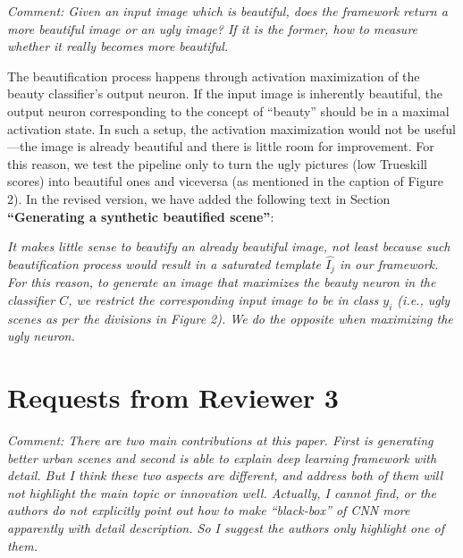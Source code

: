 \documentclass{paper}
\newenvironment{myquote}
{\definecolor{shadecolor}{rgb}{0.9,0.95,1} \begin{shaded*} \sf \em}
{\em\end{shaded*}}
\newenvironment{myquoteOrange}
{\definecolor{shadecolor}{rgb}{1,0.9,0.83} \begin{shaded*} \sf \em}
{\em\end{shaded*}}
\begin{document}
\begin{myquote}
\noindent Comment: Given an input image which is beautiful, does the framework return a more beautiful image or an ugly image? If it is the former, how to measure whether it really becomes more beautiful. 
\end{myquote}

\noindent The beautification process happens through activation maximization of the beauty classifier's output neuron. If the input image is inherently beautiful, the output neuron corresponding to the concept of ``beauty'' should be in a maximal activation state. In such a setup, the activation maximization would not be useful---the image is already beautiful and there is little room for improvement. For this reason, we test the pipeline only to turn the ugly pictures (low Trueskill scores) into beautiful ones and viceversa (as mentioned in the caption of Figure 2).
In the revised version, we have added the following text in Section \textbf{``Generating a synthetic beautified scene''}:

\begin{myquoteOrange}
It makes little sense to beautify an already beautiful image, not least because such beautification process would result in a saturated template $\hat{I_j}$ in our framework. For this reason, to generate an image that maximizes the beauty neuron in the classifier $C$, we restrict the  corresponding input image to be in class $y_i$ (i.e., ugly scenes as per the divisions in Figure 2). We do the opposite when maximizing the ugly neuron. 
\end{myquoteOrange}


\section*{Requests from Reviewer 3}

\begin{myquote}
\noindent Comment: There are two main contributions at this paper. First is generating better urban scenes and second is able to explain deep learning framework with detail. But I think these two aspects are different, and address both of them will not highlight the main topic or innovation well. Actually, I cannot find, or the authors do not explicitly point out how to make ``black-box'' of CNN more apparently with detail description. So I suggest the authors only highlight one of them.
\end{myquote}
\end{document}
